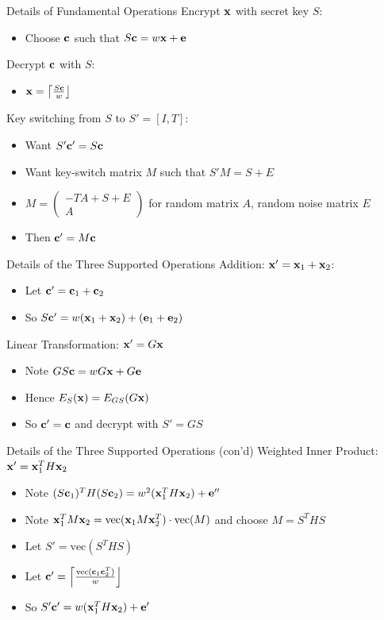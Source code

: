 \documentclass{beamer}
\newcommand{\itz}[1]{\begin{itemize}#1\end{itemize}} %
\newcommand{\bbc}{{\bf c}} %
\newcommand{\bbe}{{\bf e}} %
\newcommand{\bbx}{{\bf x}} %
\begin{document}
\begin{frame}{Details of Fundamental Operations}
Encrypt $\bbx$ with secret key $S$:
\itz{
\item{ Choose $\bbc$ such that $S\bbc = w\bbx + \bbe$ }
}
\vspace{.15in}
Decrypt $\bbc$ with $S$:
\itz{
\item{$\bbx = \left\lceil \frac{S\bbc}{w} \right\rfloor$}
}
\vspace{.15in}
Key switching from $S$ to $S'=[I,T]$:
\itz{
\item{Want $S'\bbc' = S\bbc$}
\item{Want key-switch matrix $M$ such that $S'M=S+E$}
\item{$M=\begin{pmatrix}
-TA + S + E \\
A 
\end{pmatrix}$ for random matrix $A$, random noise matrix $E$}
\item{Then $\bbc'=M\bbc$}
}
\end{frame}





\begin{frame}{Details of the Three Supported Operations}
Addition: $\bbx' = \bbx_1 + \bbx_2$:
\itz{
\item{Let $\bbc' = \bbc_1 + \bbc_2$}
\item{So $S\bbc'=w(\bbx_1+\bbx_2)+(\bbe_1+\bbe_2)$}
}
\vspace{.15in}
Linear Transformation: $\bbx' = G\bbx$
\itz{
\item{Note $GS\bbc = wG\bbx + G\bbe$}
\item{Hence $E_S(\bbx) = E_{GS}(G\bbx)$}
\item{So $\bbc'=\bbc$ and decrypt with $S' = GS$}
}
\end{frame}




\begin{frame}{Details of the Three Supported Operations (con'd)}
Weighted Inner Product: $\bbx' = \bbx_1^T H \bbx_2$
\vspace{.07in}
\itz{
\item{Note $(S\bbc_1)^T H (S\bbc_2) = w^2(\bbx_1^T H \bbx_2)+\bbe''$}
\vspace{.07in}
\item{Note $\bbx_1^T M \bbx_2 = \text{vec}(\bbx_1 M \bbx_2^T)\cdot \text{vec}(M)$ and choose $M=S^T H S$}
\vspace{.05in}
\item{Let $S'=\text{vec}(S^T H S) $}
\item{Let $\bbc'=\left\lceil \frac{\text{vec}(\bbc_1 \bbc_2^T)}{w} \right\rfloor$}
\item{So $S'\bbc' = w(\bbx_1^T H \bbx_2) + \bbe'$}
}
\end{frame}
\end{document}
